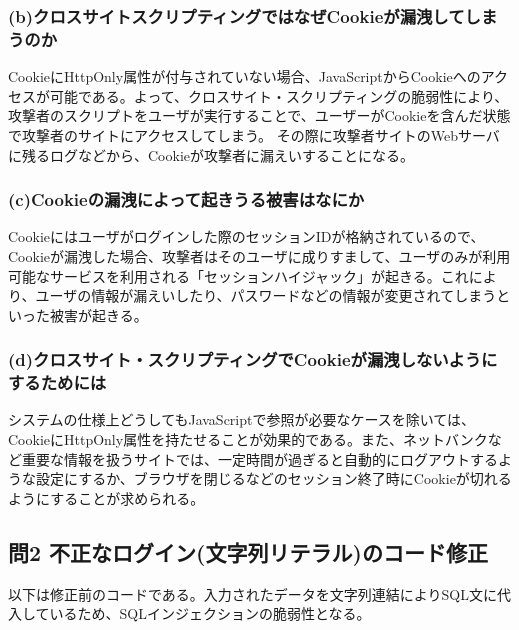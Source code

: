 \documentclass[dvipdfmx,autodetect-engine,titlepage]{jsarticle}
\begin{document}
\subsubsection{(b)クロスサイトスクリプティングではなぜCookieが漏洩してしまうのか}
CookieにHttpOnly属性が付与されていない場合、JavaScriptからCookieへのアクセスが可能である。よって、クロスサイト・スクリプティングの脆弱性により、攻撃者のスクリプトをユーザが実行することで、ユーザーがCookieを含んだ状態で攻撃者のサイトにアクセスしてしまう。
その際に攻撃者サイトのWebサーバに残るログなどから、Cookieが攻撃者に漏えいすることになる。\\
\subsubsection{(c)Cookieの漏洩によって起きうる被害はなにか}
Cookieにはユーザがログインした際のセッションIDが格納されているので、Cookieが漏洩した場合、攻撃者はそのユーザに成りすまして、ユーザのみが利用可能なサービスを利用される「セッションハイジャック」が起きる。これにより、ユーザの情報が漏えいしたり、パスワードなどの情報が変更されてしまうといった被害が起きる。\\

\subsubsection{(d)クロスサイト・スクリプティングでCookieが漏洩しないようにするためには}
システムの仕様上どうしてもJavaScriptで参照が必要なケースを除いては、CookieにHttpOnly属性を持たせることが効果的である。また、ネットバンクなど重要な情報を扱うサイトでは、一定時間が過ぎると自動的にログアウトするような設定にするか、ブラウザを閉じるなどのセッション終了時にCookieが切れる
ようにすることが求められる。\\

\subsection{問2 不正なログイン(文字列リテラル)のコード修正}
以下は修正前のコードである。入力されたデータを文字列連結によりSQL文に代入しているため、SQLインジェクションの脆弱性となる。\\
\end{document}
